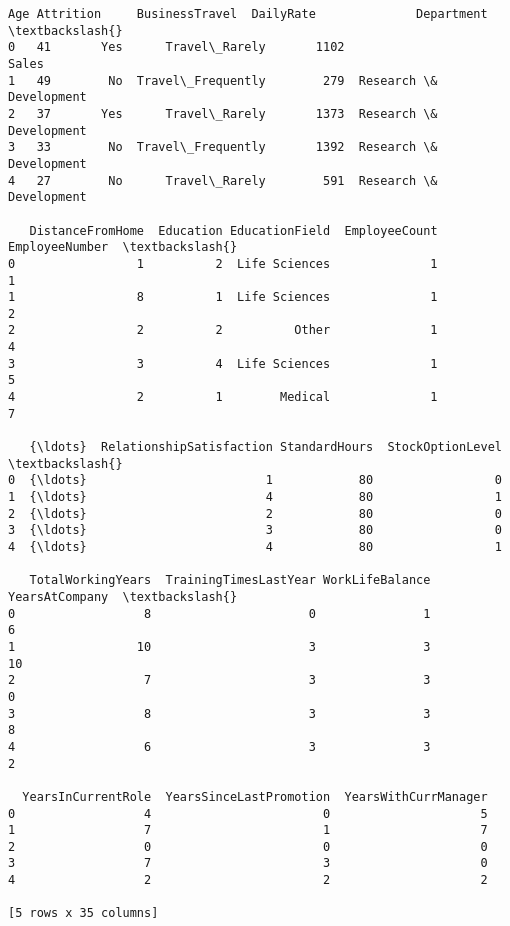 \documentclass[11pt]{article}
\makeatletter
\newcommand{\boxspacing}{\kern\kvtcb@left@rule\kern\kvtcb@boxsep}
\newcommand{\prompt}[4]{
        {\ttfamily\llap{{\color{#2}[#3]:\hspace{3pt}#4}}\vspace{-\baselineskip}}
    }
\makeatother
\begin{document}
            \begin{tcolorbox}[breakable, size=fbox, boxrule=.5pt, pad at break*=1mm, opacityfill=0]
\prompt{Out}{outcolor}{3}{\boxspacing}
\begin{Verbatim}[commandchars=\\\{\}]
   Age Attrition     BusinessTravel  DailyRate              Department  \textbackslash{}
0   41       Yes      Travel\_Rarely       1102                   Sales
1   49        No  Travel\_Frequently        279  Research \& Development
2   37       Yes      Travel\_Rarely       1373  Research \& Development
3   33        No  Travel\_Frequently       1392  Research \& Development
4   27        No      Travel\_Rarely        591  Research \& Development

   DistanceFromHome  Education EducationField  EmployeeCount  EmployeeNumber  \textbackslash{}
0                 1          2  Life Sciences              1               1
1                 8          1  Life Sciences              1               2
2                 2          2          Other              1               4
3                 3          4  Life Sciences              1               5
4                 2          1        Medical              1               7

   {\ldots}  RelationshipSatisfaction StandardHours  StockOptionLevel  \textbackslash{}
0  {\ldots}                         1            80                 0
1  {\ldots}                         4            80                 1
2  {\ldots}                         2            80                 0
3  {\ldots}                         3            80                 0
4  {\ldots}                         4            80                 1

   TotalWorkingYears  TrainingTimesLastYear WorkLifeBalance  YearsAtCompany  \textbackslash{}
0                  8                      0               1               6
1                 10                      3               3              10
2                  7                      3               3               0
3                  8                      3               3               8
4                  6                      3               3               2

  YearsInCurrentRole  YearsSinceLastPromotion  YearsWithCurrManager
0                  4                        0                     5
1                  7                        1                     7
2                  0                        0                     0
3                  7                        3                     0
4                  2                        2                     2

[5 rows x 35 columns]
\end{Verbatim}
\end{tcolorbox}
        
\end{document}
